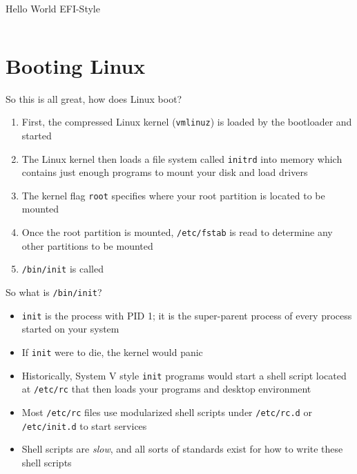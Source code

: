 \documentclass{lug}
\begin{document}
\begin{frame}{Hello World EFI-Style}
    \small
    \inputminted{c}{efi_hello_world.c}
\end{frame}

\section{Booting Linux}

\begin{frame}{So this is all great, how does Linux boot?}
    \begin{enumerate}[<+->]
        \item First, the compressed Linux kernel (\texttt{vmlinuz}) is loaded
            by the bootloader and started
        \item The Linux kernel then loads a file system called \texttt{initrd}
            into memory which contains just enough programs to mount your disk
            and load drivers
        \item The kernel flag \texttt{root} specifies where your root partition
            is located to be mounted
        \item Once the root partition is mounted, \texttt{/etc/fstab} is read
            to determine any other partitions to be mounted
        \item \texttt{/bin/init} is called
    \end{enumerate}
\end{frame}

\begin{frame}{So what is \texttt{/bin/init}?}
    \begin{itemize}[<+->]
        \item \texttt{init} is the process with PID 1; it is the super-parent
            process of every process started on your system
        \item If \texttt{init} were to die, the kernel would panic
        \item Historically, System V style \texttt{init} programs would start a
            shell script located at \texttt{/etc/rc} that then loads your
            programs and desktop environment
        \item Most \texttt{/etc/rc} files use modularized shell scripts under
            \texttt{/etc/rc.d} or \texttt{/etc/init.d} to start services
        \item Shell scripts are \emph{slow}, and all sorts of standards exist
            for how to write these shell scripts
    \end{itemize}
\end{frame}
\end{document}

